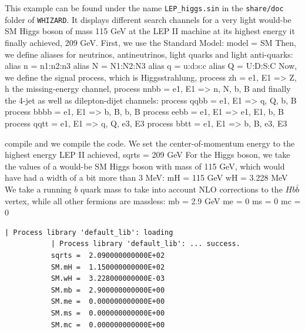 \documentclass[12pt]{book}
\newenvironment{code}%
  {\begingroup\footnotesize
   \quote
   \Verbatim}%
  {\endVerbatim
   \endquote
   \endgroup\noindent}
\newcommand{\ttt}[1]{\texttt{#1}}
\newcommand{\whizard}{\ttt{WHIZARD}}
\begin{document}
This example can be found under the name \ttt{LEP\_higgs.sin} in the
\ttt{share/doc} folder of \whizard. It displays different search
channels for a very light would-be SM Higgs boson of mass 115 GeV at
the LEP II machine at its highest energy it finally achieved, 209 GeV.
First, we use the Standard Model:
\begin{code}
model = SM
\end{code}
Then, we define aliases for neutrinos, antineutrinos, light quarks and
light anti-quarks:
\begin{code}
alias n = n1:n2:n3
alias N = N1:N2:N3
alias q = u:d:s:c
alias Q = U:D:S:C
\end{code}
Now, we define the signal process, which is Higgsstrahlung,
\begin{code}
process zh = e1, E1 => Z, h
\end{code}
the missing-energy channel,
\begin{code}
process nnbb = e1, E1 => n, N, b, B
\end{code}
and finally the 4-jet as well as dilepton-dijet channels:
\begin{code}
process qqbb = e1, E1 => q, Q, b, B
process bbbb = e1, E1 => b, B, b, B
process eebb = e1, E1 => e1, E1, b, B
process qqtt = e1, E1 => q, Q, e3, E3
process bbtt = e1, E1 => b, B, e3, E3

compile
\end{code}
and we compile the code. We set the center-of-momentum energy to the
highest energy LEP II achieved,
\begin{code}
sqrts = 209 GeV
\end{code}
For the Higgs boson, we take the values of a would-be SM Higgs boson
with mass of 115 GeV, which would have had a width of a bit more than
3 MeV:
\begin{code}
mH = 115 GeV
wH = 3.228 MeV
\end{code}
We take a running $b$ quark mass to take into account NLO corrections
to the $Hb\bar b$ vertex, while all other fermions are massless:
\begin{code}
mb = 2.9 GeV
me = 0
ms = 0
mc = 0
\end{code}
\begin{scriptsize}
\begin{Verbatim}[frame=single]
           | Process library 'default_lib': loading
           | Process library 'default_lib': ... success.
           sqrts =  2.090000000000E+02
           SM.mH =  1.150000000000E+02
           SM.wH =  3.228000000000E-03
           SM.mb =  2.900000000000E+00
           SM.me =  0.000000000000E+00
           SM.ms =  0.000000000000E+00
           SM.mc =  0.000000000000E+00
\end{Verbatim}
\end{scriptsize}
\end{document}
